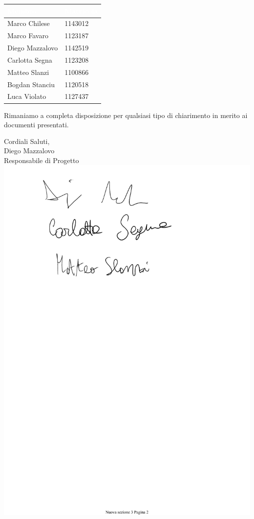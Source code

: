 \documentclass[11pt, a4paper]{letter} %
\begin{document}
\begin{letter}
		\begin{center}
			\begin{longtable}[c]{|m{}m{}|} 
				\hline
				\rowcolor{bluelogo}\textbf{\textcolor{white}{Membro}}  & \textbf{\textcolor{white}{Matricola}}\\
				\hline
				Marco Chilese & 1143012\\
				\hline
				\rowcolor{grigio}Marco Favaro & 1123187\\ 
				\hline
				Diego Mazzalovo & 1142519\\
				\hline
				\rowcolor{grigio}Carlotta Segna & 1123208\\
				\hline
				Matteo Slanzi & 1100866\\
				\hline
				\rowcolor{grigio}Bogdan Stanciu  & 1120518\\
				\hline
				Luca Violato & 1127437\\
				\hline
			\end{longtable}
		\end{center}
		
		Rimaniamo a completa disposizione per qualsiasi tipo di chiarimento in merito ai documenti presentati.
		
		\closing{Cordiali Saluti,\\
			Diego Mazzalovo\\
			Responsabile di Progetto
			\includegraphics[scale=0.5]{images/DiegoMazzalovo.pdf}}
		

\end{letter}
\end{document}
